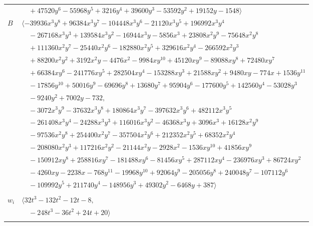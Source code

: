 \documentclass[11pt]{article}
\begin{document}
\begin{longtable}{@{}ll@{}}
 & $\quad +47520y^{6}-55968y^{5}+3216y^{4}+39600y^{3}-53592y^{2}+19152y-1548\rangle$\\
$B$ & $\langle -39936x^{3}y^{8}+96384x^{3}y^{7}-104448x^{3}y^{6}-21120x^{3}y^{5}+196992x^{3}y^{4}$\\
 & $\quad -267168x^{3}y^{3}+139584x^{3}y^{2}-16944x^{3}y-5856x^{3}+23808x^{2}y^{9}-75648x^{2}y^{8}$\\
 & $\quad +111360x^{2}y^{7}-25440x^{2}y^{6}-182880x^{2}y^{5}+329616x^{2}y^{4}-266592x^{2}y^{3}$\\
 & $\quad +88200x^{2}y^{2}+3192x^{2}y-4476x^{2}-9984xy^{10}+45120xy^{9}-89088xy^{8}+72480xy^{7}$\\
 & $\quad +66384xy^{6}-241776xy^{5}+282504xy^{4}-153288xy^{3}+21588xy^{2}+9480xy-774x+1536y^{11}$\\
 & $\quad -17856y^{10}+50016y^{9}-69696y^{8}+13680y^{7}+95904y^{6}-177600y^{5}+142560y^{4}-53028y^{3}$\\
 & $\quad -9240y^{2}+7002y-732,$\\
 & $\quad -3072x^{3}y^{9}-37632x^{3}y^{8}+180864x^{3}y^{7}-397632x^{3}y^{6}+482112x^{3}y^{5}$\\
 & $\quad -261408x^{3}y^{4}-24288x^{3}y^{3}+116016x^{3}y^{2}-46368x^{3}y+3096x^{3}+16128x^{2}y^{9}$\\
 & $\quad -97536x^{2}y^{8}+254400x^{2}y^{7}-357504x^{2}y^{6}+212352x^{2}y^{5}+68352x^{2}y^{4}$\\
 & $\quad -208080x^{2}y^{3}+117216x^{2}y^{2}-21144x^{2}y-2928x^{2}-1536xy^{10}+41856xy^{9}$\\
 & $\quad -150912xy^{8}+258816xy^{7}-181488xy^{6}-81456xy^{5}+287112xy^{4}-236976xy^{3}+86724xy^{2}$\\
 & $\quad -4260xy-2238x-768y^{11}-19968y^{10}+92064y^{9}-205056y^{8}+240048y^{7}-107112y^{6}$\\
 & $\quad -109992y^{5}+211740y^{4}-148956y^{3}+49302y^{2}-6468y+387\rangle$\\
\addlinespace[2pt]
\multicolumn{2}{@{}p{0.97\textwidth}@{}}{$i=48$, $D_i=8$, $\rho_{ij}$: $10{:}1, \allowbreak 12{:}1, \allowbreak 17{:}1, \allowbreak 21{:}1, \allowbreak 22{:}2, \allowbreak 36{:}2, \allowbreak 40{:}2, \allowbreak 50{:}2, \allowbreak 52{:}1$}\\
$w_i$ & $\langle 32t^{3}-132t^{2}-12t-8,$\\
 & $\quad -248t^{3}-36t^{2}+24t+20\rangle$\\
\addlinespace[2pt]
\multicolumn{2}{@{}p{0.97\textwidth}@{}}{$i=49$, $D_i=16$, $\rho_{ij}$: $10{:}1, \allowbreak 11{:}2, \allowbreak 12{:}1, \allowbreak 16{:}2, \allowbreak 24{:}1, \allowbreak 25{:}1$}\\

\end{longtable}
\end{document}
